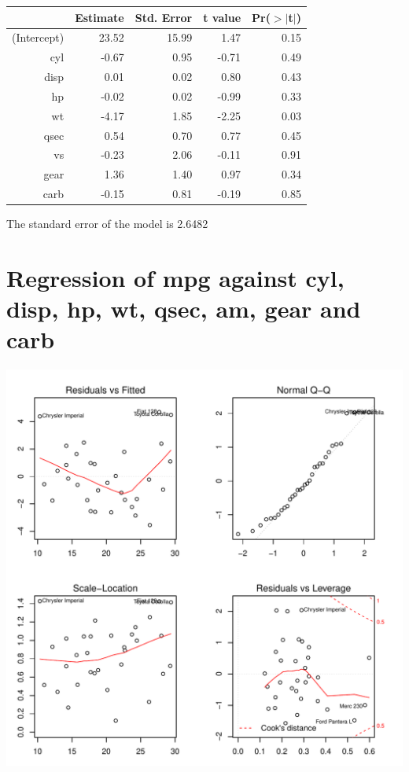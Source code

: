 \documentclass{article}\usepackage[]{graphicx}\usepackage[]{color}
\makeatletter
\def\maxwidth{ %
  \ifdim\Gin@nat@width>\linewidth
    \linewidth
  \else
    \Gin@nat@width
  \fi
}
\newenvironment{knitrout}{}{} %
\makeatother
\begin{document}
\begin{table}[ht]
\centering
\begin{tabular}{rrrrr}
  \hline
 & Estimate & Std. Error & t value & Pr($>$$|$t$|$) \\ 
  \hline
(Intercept) & 23.52 & 15.99 & 1.47 & 0.15 \\ 
  cyl & -0.67 & 0.95 & -0.71 & 0.49 \\ 
  disp & 0.01 & 0.02 & 0.80 & 0.43 \\ 
  hp & -0.02 & 0.02 & -0.99 & 0.33 \\ 
  wt & -4.17 & 1.85 & -2.25 & 0.03 \\ 
  qsec & 0.54 & 0.70 & 0.77 & 0.45 \\ 
  vs & -0.23 & 2.06 & -0.11 & 0.91 \\ 
  gear & 1.36 & 1.40 & 0.97 & 0.34 \\ 
  carb & -0.15 & 0.81 & -0.19 & 0.85 \\ 
   \hline
\end{tabular}
\end{table}




The standard error of the model is 2.6482

\newpage

\section{Regression of mpg against cyl, disp, hp, wt, qsec, am, gear and carb }
\begin{knitrout}
\color{fgcolor}

{\centering \includegraphics[width=\maxwidth]{figure/lm-cyl-disp-hp-wt-qsec-am-gear-carb} 

}



\end{knitrout}
\end{document}
